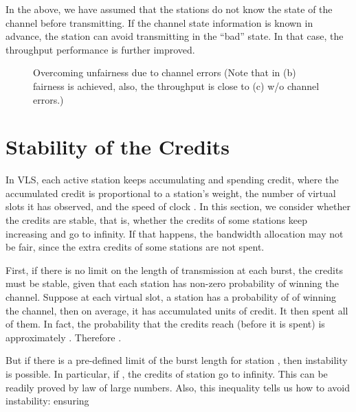 \documentclass[letterpaper, 10 pt, conference]{ieeeconf}
\begin{document}
In the above, we have assumed that the stations do not know the state
of the channel before transmitting. If the channel state information
is known in advance, the station can avoid transmitting in the {}``bad''
state. In that case, the throughput performance is further improved.

\begin{figure}


\caption{\label{fig:channel error}Overcoming unfairness due to channel errors (Note that in (b) fairness is achieved, also, the throughput is close
to (c) w/o channel errors.)}

\end{figure}




\section{\label{sec:Stability}Stability of the Credits}

In VLS, each active station keeps accumulating and spending credit, where the accumulated credit is proportional to a station's weight, the number of virtual slots it has observed, and the speed of clock . In this section, we consider whether the credits are stable, that is,
whether the credits of some stations keep increasing and go to infinity.
If that happens, the bandwidth allocation may not be fair, since the
extra credits of some stations are not spent.

First, if there is no limit on the length of transmission at each
burst, the credits must be stable, given that each station has non-zero
probability of winning the channel. Suppose at each virtual slot,
a station  has a probability of  of winning the channel,
then on average, it has accumulated  units
of credit. It then spent all of them. In fact, the probability that
the credits reach  (before it is spent) is approximately .
Therefore .

But if there is a pre-defined limit of the burst length  for
station , then instability is possible. In particular, if ,
the credits of station  go to infinity. This can be readily proved
by law of large numbers. Also, this inequality tells us how to avoid
instability: ensuring 
\end{document}
